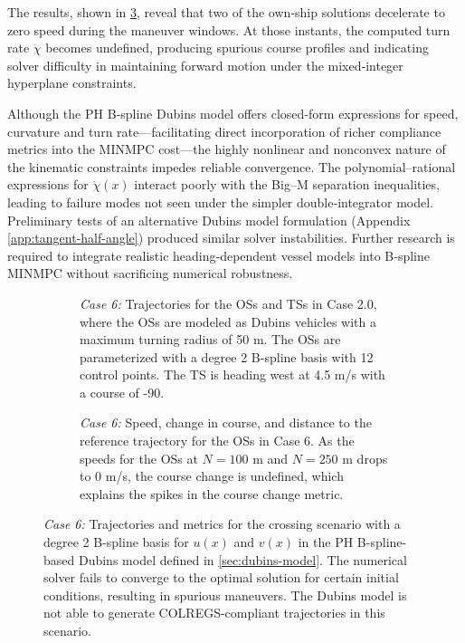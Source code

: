 The results, shown in \cref{fig:crossing-advanced-scenario-10-2-dubins}, reveal that two of the own‐ship solutions decelerate to zero speed during the maneuver windows. At those instants, the computed turn rate \(\dot\chi\) becomes undefined, producing spurious course profiles and indicating solver difficulty in maintaining forward motion under the mixed‐integer hyperplane constraints.

Although the PH B‐spline Dubins model offers closed‐form expressions for speed, curvature and turn rate---facilitating direct incorporation of richer compliance metrics into the MINMPC cost---the highly nonlinear and nonconvex nature of the kinematic constraints impedes reliable convergence. The polynomial–rational expressions for \(\dot\chi(x)\) interact poorly with the Big–M separation inequalities, leading to failure modes not seen under the simpler double‐integrator model. Preliminary tests of an alternative Dubins model formulation (Appendix \ref{app:tangent-half-angle}) produced similar solver instabilities. Further research is required to integrate realistic heading‐dependent vessel models into B‐spline MINMPC without sacrificing numerical robustness.



\begin{figure}
    \centering
    \begin{subfigure}[b]{\textwidth}
        \centering
        
        \caption{\textit{Case 6:} Trajectories for the OSs and TSs in Case 2.0, where the OSs are modeled as Dubins vehicles with a maximum turning radius of 50 m. The OSs are parameterized with a degree 2 B-spline basis with 12 control points. The TS is heading west at 4.5 m/s with a course of -90\degree.}
        \label{fig:crossing-advanced-scenario-10-2-dubins-traj}
    \end{subfigure}
    \begin{subfigure}[b]{\textwidth}
        \centering
        
        \caption{\textit{Case 6:} Speed, change in course, and distance to the reference trajectory for the OSs in Case 6. As the speeds for the OSs at $N=100$ m and $N=250$ m drops to 0 m/s, the course change is undefined, which explains the spikes in the course change metric.}
        \label{fig:crossing-advanced-scenario-10-2-dubins-metrics}
    \end{subfigure}
    \caption{\textit{Case 6:} Trajectories and metrics for the crossing scenario with a degree 2 B-spline basis for $u(x)$ and $v(x)$ in the PH B-spline-based Dubins model defined in \cref{sec:dubins-model}. The numerical solver fails to converge to the optimal solution for certain initial conditions, resulting in spurious maneuvers. The Dubins model is not able to generate COLREGS-compliant trajectories in this scenario.}
    \label{fig:crossing-advanced-scenario-10-2-dubins}
\end{figure}

